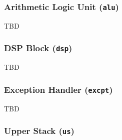 \subsubsection{Arithmetic Logic Unit (\texttt{alu})}
\label{architecture:comp:alu}

TBD



\subsubsection{DSP Block (\texttt{dsp})}
\label{architecture:comp:dsp}

TBD



\subsubsection{Exception Handler (\texttt{excpt})}
\label{architecture:comp:excpt}

TBD



\subsubsection{Upper Stack (\texttt{us})}
\label{architecture:comp:us}

